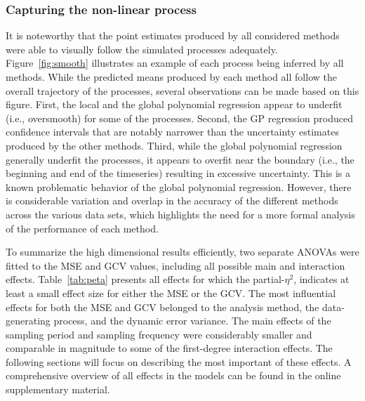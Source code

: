 \documentclass[man, floatsintext]{apa7}
\begin{document}
\subsubsection{Capturing the non-linear process}

It is noteworthy that the point estimates produced by all considered methods
were able to visually follow the simulated processes adequately.
Figure~\ref{fig:smooth} illustrates an example of each process being inferred
by all methods. While the predicted means produced by each method all follow
the overall trajectory of the processes, several observations can be made based
on this figure. First, the local and the global polynomial regression appear to
underfit (i.e., oversmooth) for some of the processes. Second, the GP
regression produced confidence intervals that are notably narrower than the
uncertainty estimates produced by the other methods. Third, while the global
polynomial regression generally underfit the processes, it appears to overfit
near the boundary (i.e., the beginning and end of the timeseries) resulting in
excessive uncertainty. This is a known problematic behavior of the global
polynomial regression. However, there is considerable variation and overlap in
the accuracy of the different methods across the various data sets, which
highlights the need for a more formal analysis of the performance of each
method.

\begin{sidewaysfigure*}[htbp]
  \caption{Example processes inferred by each of the introduced methods}
  \label{fig:smooth}
\end{sidewaysfigure*}

To summarize the high dimensional results efficiently, two separate ANOVAs were
fitted to the MSE and GCV values, including all possible main and interaction
effects. Table~\ref{tab:peta} presents all effects for which the
partial-$\eta^2$, indicates at least a small effect size for either the MSE or
the GCV\@. The most influential effects for both the MSE and GCV belonged to
the analysis method, the data-generating process, and the dynamic error
variance. The main effects of the sampling period and sampling frequency were
considerably smaller and comparable in magnitude to some of the first-degree
interaction effects. The following sections will focus on describing the most
important of these effects. A comprehensive overview of all effects in the
models can be found in the online supplementary material.
\end{document}
